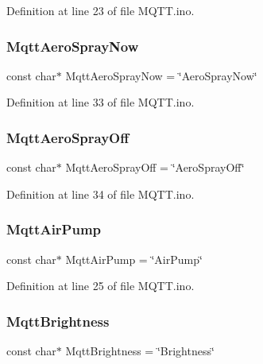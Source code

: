 Definition at line 23 of file M\+Q\+T\+T.\+ino.

\mbox{\label{_m_q_t_t_8ino_afad460b71f5a1b80266f610462c30eb8}} 
\subsubsection{\texorpdfstring{MqttAeroSprayNow}{MqttAeroSprayNow}}
{\footnotesize\ttfamily const char$\ast$ Mqtt\+Aero\+Spray\+Now = \char`\"{}Aero\+Spray\+Now\char`\"{}}



Definition at line 33 of file M\+Q\+T\+T.\+ino.

\mbox{\label{_m_q_t_t_8ino_a18db3b99bbabfd1f942f9c966825bb6f}} 
\subsubsection{\texorpdfstring{MqttAeroSprayOff}{MqttAeroSprayOff}}
{\footnotesize\ttfamily const char$\ast$ Mqtt\+Aero\+Spray\+Off = \char`\"{}Aero\+Spray\+Off\char`\"{}}



Definition at line 34 of file M\+Q\+T\+T.\+ino.

\mbox{\label{_m_q_t_t_8ino_af19f86a96d76f2d391f24f0c8ae7dde3}} 
\subsubsection{\texorpdfstring{MqttAirPump}{MqttAirPump}}
{\footnotesize\ttfamily const char$\ast$ Mqtt\+Air\+Pump = \char`\"{}Air\+Pump\char`\"{}}



Definition at line 25 of file M\+Q\+T\+T.\+ino.

\mbox{\label{_m_q_t_t_8ino_ae80a3bf9e4e5b642dedfcb2c4520f36d}} 
\subsubsection{\texorpdfstring{MqttBrightness}{MqttBrightness}}
{\footnotesize\ttfamily const char$\ast$ Mqtt\+Brightness = \char`\"{}Brightness\char`\"{}}



